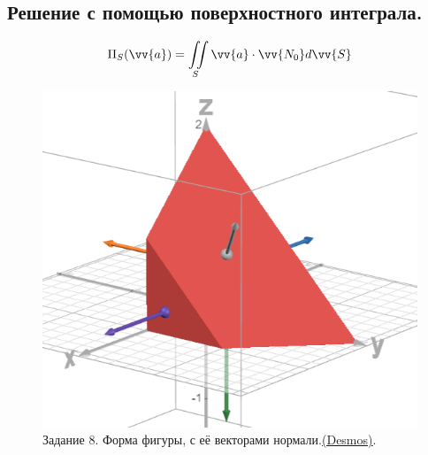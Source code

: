 \newpage
\subsection{Решение с помощью поверхностного интеграла.}

$$\Pi_S(\vv{a}) = \iint \limits_S \vv{a} \cdot \vv{N_0} d\vv{S}$$


\begin{figure}[h!t]
    \centering
    \includegraphics[width=0.75\linewidth]{Task8/Normal_vectors.png}
    \caption{Задание 8. Форма фигуры, с её векторами нормали.\underline{\href{https://www.desmos.com/3D/p0j1s5t0mn}{(Desmos)}}.}
\end{figure}
